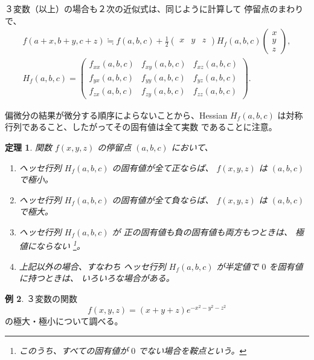 \documentclass[a4paper]{jsarticle}
\newtheorem{Theorem}{定理}[section]
\theoremstyle{definition}
\newtheorem{Example}[Theorem]{例}
\theoremstyle{remark}
\begin{document}

３変数（以上）の場合も２次の近似式は、同じように計算して
停留点のまわりで、
\begin{gather*}
f(a+x,b+y,c+z) 
\fallingdotseq 
f(a,b,c) + 
\frac{1}{2}
\begin{pmatrix}
x & y & z
\end{pmatrix}
H_f(a,b,c) 
\begin{pmatrix}
x\\ y\\ z
\end{pmatrix},\\
H_f(a,b,c) = 
\begin{pmatrix}
f_{xx}(a,b,c) & f_{xy}(a,b,c) & f_{xz}(a,b,c)\\
f_{yx}(a,b,c) & f_{yy}(a,b,c) & f_{yz}(a,b,c)\\
f_{zx}(a,b,c) & f_{zy}(a,b,c) & f_{zz}(a,b,c)
\end{pmatrix}.
\end{gather*}

偏微分の結果が微分する順序によらないことから、Hessian  
$H_f(a,b,c)$ は対称行列であること、したがってその固有値は全て実数
であることに注意。

\begin{Theorem}
関数 $f(x,y,z)$ の停留点 $(a,b,c)$ において、
\begin{enumerate}
\item 
ヘッセ行列 $H_f(a,b,c)$ の固有値が全て正ならば、
$f(x,y,z)$ は $(a,b,c)$ で極小。
\item 
ヘッセ行列 $H_f(a,b,c)$ の固有値が全て負ならば、
$f(x,y,z)$ は $(a,b,c)$ で極大。
\item 
ヘッセ行列 $H_f(a,b,c)$ が 正の固有値も負の固有値も両方もつときは、
極値にならない
\footnote{このうち、すべての固有値が $0$ でない場合を鞍点という。}。
\item 
上記以外の場合、すなわち
ヘッセ行列 $H_f(a,b,c)$ が半定値で $0$ を固有値に持つときは、
いろいろな場合がある。
\end{enumerate}
\end{Theorem}


\begin{Example}
３変数の関数 
\[
f(x,y,z) = (x + y + z )e^{-x^2-y^2-z^2}
\]
の極大・極小について調べる。
\end{Example}
\end{document}
